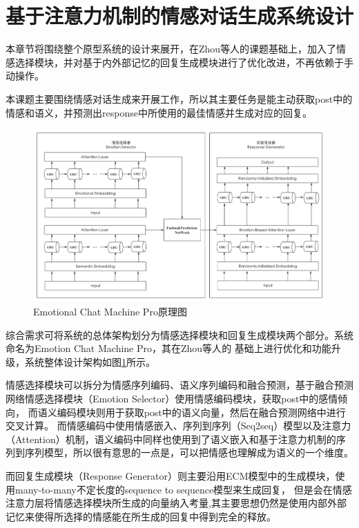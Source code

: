 \documentclass[supercite]{HustGraduPaper}
\theoremstyle{definition}
\begin{document}
\section{基于注意力机制的情感对话生成系统设计}
本章节将围绕整个原型系统的设计来展开，在Zhou\cite{DBLP:journals/corr/ZhouHZZL17}等人的课题基础上，加入了情感选择模块，并对基于内外部记忆的回复生成模块进行了优化改进，不再依赖于手动操作。

本课题主要围绕情感对话生成来开展工作，所以其主要任务是能主动获取post中的情感和语义，并预测出response中所使用的最佳情感并生成对应的回复。
\begin{figure}[H] %
  \centering %
  \includegraphics[width=1\textwidth]{images/ECMP.png} %
  \caption{Emotional Chat Machine Pro原理图} %
  \label{Fig.ECMP} %
\end{figure}
综合需求可将系统的总体架构划分为情感选择模块和回复生成模块两个部分。系统命名为Emotion Chat Machine Pro，其在Zhou等人\cite{DBLP:journals/corr/ZhouHZZL17}的
基础上进行优化和功能升级，系统整体设计架构如图\ref{Fig.ECMP}所示。

情感选择模块可以拆分为情感序列编码、语义序列编码和融合预测，基于融合预测网络情感选择模块\cite{wei2019emotion}（Emotion Selector）使用情感编码模块，获取post中的感情倾向，
而语义编码模块则用于获取post中的语义向量，然后在融合预测网络中进行交叉计算。
而情感编码中使用情感嵌入、序列到序列（Seq2seq）模型以及注意力（Attention）机制，语义编码中同样也使用到了语义嵌入和基于注意力机制的序列到序列模型，所以很有意思的一点是，可以把情感也理解成为语义的一个维度。

而回复生成模块（Response Generator）则主要沿用ECM\cite{DBLP:journals/corr/ZhouHZZL17}模型中的生成模块，使用many-to-many不定长度的sequence to sequence模型来生成回复，
但是会在情感注意力层将情感选择模块所生成的向量纳入考量,其主要思想仍然是使用内部外部记忆来使得所选择的情感能在所生成的回复中得到完全的释放。
\end{document}
